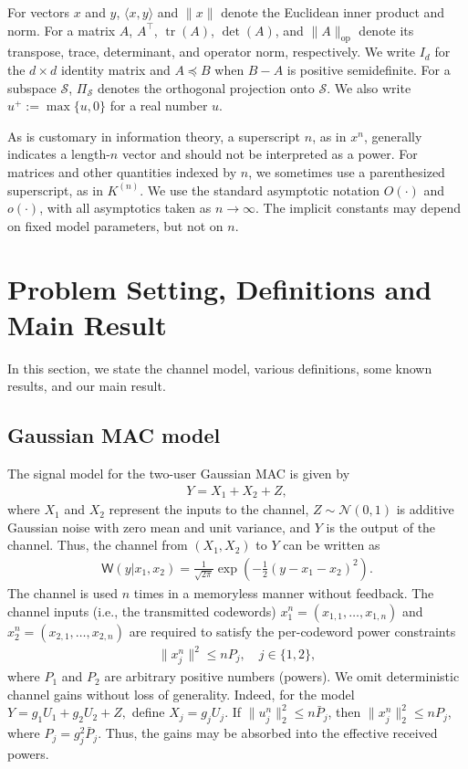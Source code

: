 \documentclass[11pt,onecolumn]{IEEEtran}
\newcommand{\calN}{\mathcal{N}}
\newcommand{\calS}{\mathcal{S}}
\newcommand{\rvW}{\mathsf{W}}
\DeclareMathOperator{\tr}{tr}
\begin{document}
For vectors $x$ and $y$, $\langle x,y\rangle$ and $\|x\|$ denote the Euclidean inner product and norm. For a matrix $A$, $A^\top$, $\tr(A)$, $\det(A)$, and $\|A\|_{\mathrm{op}}$ denote its transpose, trace, determinant, and operator norm, respectively. We write $I_d$ for the $d\times d$ identity matrix and $A\preceq B$ when $B-A$ is positive semidefinite. For a subspace $\calS$, $\Pi_{\calS}$ denotes the orthogonal projection onto $\calS$. We also write $u^+:=\max\{u,0\}$ for a real number $u$.

As is customary in information theory, a superscript $n$, as in $x^n$, generally indicates a length-$n$ vector and should not be interpreted as a power. For matrices and other quantities indexed by $n$, we sometimes use a parenthesized superscript, as in $K^{(n)}$. We use the standard asymptotic notation $O(\cdot)$ and $o(\cdot)$, with all asymptotics taken as $n\to\infty$. The implicit constants may depend on fixed model parameters, but not on $n$.

\section{Problem Setting, Definitions and Main Result}
In this section, we state the channel model, various definitions, some known results, and our main result.   



\subsection{Gaussian MAC  model}
The signal model for the two-user Gaussian MAC is given by 
\begin{align}
Y=  X_1 + X_2 + Z, \label{eqn:channel}
\end{align}
where $X_1$ and $X_2$ represent the inputs to the channel,  $Z\sim\calN(0,1)$ is additive Gaussian noise with zero mean and unit variance, and $Y$ is the output of the channel. Thus, the   channel  from $(X_1, X_2)$ to $Y$ can be written as 
\begin{align}
\rvW(y|x_1, x_2) = \frac{1}{\sqrt{2\pi}}\exp\left(-\frac{1}{2}(y-x_1-x_2)^2 \right).
\end{align}
The channel is used $n$ times in a memoryless manner without feedback. The channel inputs (i.e., the transmitted codewords) $x_1^n = (x_{1,1},\ldots, x_{1,n})$ and $x_2^n = (x_{2,1},\ldots, x_{2,n})$ are required to  satisfy the per-codeword power constraints
\begin{align}
\|x_j^n\|^2\le n P_j,\quad j\in \{1,2\}, \label{eqn:power_constraints}
\end{align}
where  $P_1$ and $P_2$    are arbitrary positive   numbers (powers). We omit deterministic channel gains without loss of generality. Indeed,
for the model
$
Y=g_1U_1+g_2U_2+Z,
$
define $X_j=g_jU_j$. If $\|u_j^n\|_2^2\le n\bar P_j$, then
$\|x_j^n\|_2^2\le nP_j$, where $P_j=g_j^2\bar P_j$.
Thus, the gains may be absorbed into the effective received powers.
\end{document}
